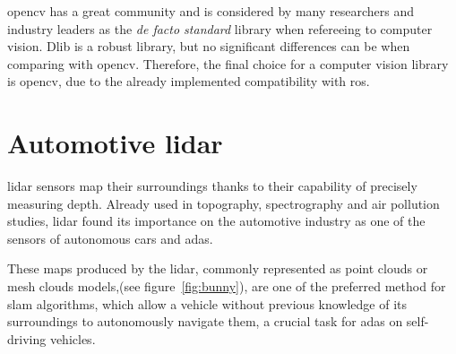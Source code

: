 \ac{opencv} has a great community and is considered by many researchers and industry leaders as the \textit{de facto standard} library when refereeing to computer vision. Dlib is a robust library, but no significant differences can be when comparing with \ac{opencv}. Therefore, the final choice for a computer vision library is \ac{opencv}, due to the already implemented compatibility with \ac{ros}.




\section{Automotive \ac{lidar}}
\ac{lidar} sensors map their surroundings thanks to their capability of precisely measuring depth. Already used in topography, spectrography and air pollution studies, \ac{lidar} found its importance on the automotive industry as one of the sensors of autonomous cars and \ac{adas}\cite{Sullivan2016}. 

These maps produced by the \ac{lidar}, commonly represented as point clouds or mesh clouds models,(see figure~\ref{fig:bunny}), are one of the preferred method for \ac{slam} algorithms, which allow a vehicle without previous knowledge of its surroundings to autonomously navigate them, a crucial task for \ac{adas} on self-driving vehicles.

